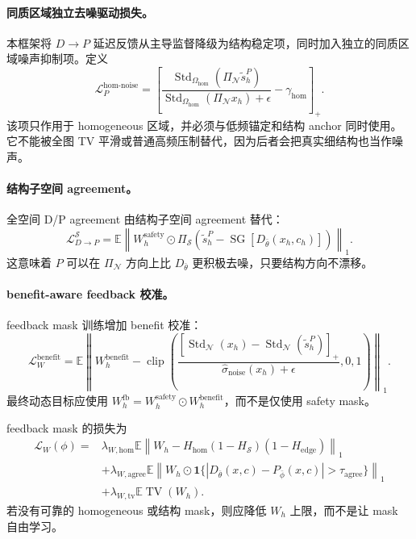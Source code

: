 \documentclass[11pt,a4paper,UTF8,fontset=fandol]{ctexart}
\theoremstyle{definition}
\DeclareMathOperator{\SG}{SG}
\DeclareMathOperator{\Std}{Std}
\DeclareMathOperator{\clip}{clip}
\DeclareMathOperator{\TV}{TV}
\newcommand{\norm}[1]{\left\lVert#1\right\rVert}
\newcommand{\E}{\mathbb{E}}
\newcommand{\cL}{\mathcal{L}}
\newcommand{\one}{\mathbf{1}}
\begin{document}
\paragraph{同质区域独立去噪驱动损失。}
本框架将 $D\to P$ 延迟反馈从主导监督降级为结构稳定项，同时加入独立的同质区域噪声抑制项。定义
\begin{equation}
\label{eq:L-P-hom-noise-coreC}
    \mathcal L_{P}^{\mathrm{hom\mbox{-}noise}}
    =\left[
    \frac{\Std_{\Omega_{\mathrm{hom}}}(\Pi_{\mathcal N}\tilde s_h^P)}
    {\Std_{\Omega_{\mathrm{hom}}}(\Pi_{\mathcal N}x_h)+\epsilon}
    -\gamma_{\mathrm{hom}}
    \right]_+.
\end{equation}
该项只作用于 homogeneous 区域，并必须与低频锚定和结构 anchor 同时使用。它不能被全图 TV 平滑或普通高频压制替代，因为后者会把真实细结构也当作噪声。

\paragraph{结构子空间 agreement。}
全空间 D/P agreement 由结构子空间 agreement 替代：
\begin{equation}
\label{eq:L-P-struct-agree-coreC}
    \mathcal L_{D\to P}^{\mathcal S}
    =\E\norm{W_h^{\mathrm{safety}}\odot
    \Pi_{\mathcal S}\left(\tilde s_h^P-\SG[D_{\bar\theta}(x_h,c_h)]\right)}_1.
\end{equation}
这意味着 $P$ 可以在 $\Pi_{\mathcal N}$ 方向上比 $D_{\bar\theta}$ 更积极去噪，只要结构方向不漂移。

\paragraph{benefit-aware feedback 校准。}
feedback mask 训练增加 benefit 校准：
\begin{equation}
\label{eq:L-W-benefit-coreC}
    \mathcal L_W^{\mathrm{benefit}}
    =\E\norm{W_h^{\mathrm{benefit}}-
    \clip\left(
    \frac{[\Std_{\mathcal N}(x_h)-\Std_{\mathcal N}(\tilde s_h^P)]_+}
    {\widehat\sigma_{\mathrm{noise}}(x_h)+\epsilon},0,1
    \right)}_1.
\end{equation}
最终动态目标应使用 $W_h^{\mathrm{fb}}=W_h^{\mathrm{safety}}\odot W_h^{\mathrm{benefit}}$，而不是仅使用 safety mask。

feedback mask 的损失为
\begin{equation}
\label{eq:feedback-mask-loss-coreB}
\begin{aligned}
\cL_W(\phi)
={}&\lambda_{W,\mathrm{hom}}\E\norm{W_h-H_{\mathrm{hom}}(1-H_{\mathcal S})(1-H_{\mathrm{edge}})}_1\\
&+\lambda_{W,\mathrm{agree}}\E\norm{W_h\odot \one\{|D_{\bar\theta}(x,c)-P_{\bar\phi}(x,c)|>\tau_{\mathrm{agree}}\}}_1\\
&+\lambda_{W,\mathrm{tv}}\E\TV(W_h).
\end{aligned}
\end{equation}
若没有可靠的 homogeneous 或结构 mask，则应降低 $W_h$ 上限，而不是让 mask 自由学习。
\end{document}
